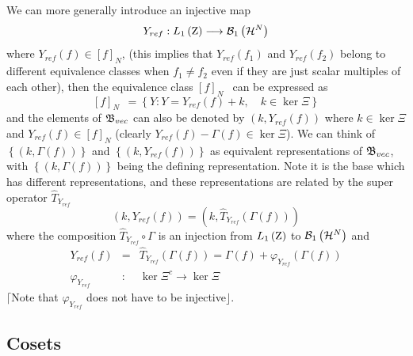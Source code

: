 We can more generally introduce an injective map 
\begin{equation}
Y_{ref}:L_{1}\left( {\rm Z}\right) \longrightarrow {\cal B}_{1}\left( {\cal H%
}^{N}\right)
\end{equation}%
where $Y_{ref}\left( f\right) \in \left[ f\right] _{N}$, (this implies that $%
Y_{ref}\left( f_{1}\right) $ and $Y_{ref}\left( f_{2}\right) $ belong to
different equivalence classes when $f_{1}\neq f_{2}$ even if they are just
scalar multiples of each other), then the equivalence class $\left[ f\right]
_{N\text{ }}$ can be expressed as 
\begin{equation}
\left[ f\right] _{N\text{ }}=\left\{ Y:Y=Y_{ref}\left( f\right) +k,\quad
k\in \ker \Xi \right\}
\end{equation}%
and the elements of ${\frak B}_{vec}$ can also be denoted by $\left(
k,Y_{ref}\left( f\right) \right) $ where $k\in \ker \Xi $ and $Y_{ref}\left(
f\right) \in \left[ f\right] _{N}$ (clearly $Y_{ref}\left( f\right) -\Gamma
\left( f\right) \in \ker \Xi $). We can think of $\left\{ \left( k,\Gamma
\left( f\right) \right) \right\} $ and $\left\{ \left( k,Y_{ref}\left(
f\right) \right) \right\} $ as equivalent representations of ${\frak B}%
_{vec} $, with $\left\{ \left( k,\Gamma \left( f\right) \right) \right\} $
being the defining representation. Note it is the base which has different
representations, and these representations are related by the super operator 
$\hat{T}_{Y_{ref}}$ 
\begin{equation}
\left( k,Y_{ref}\left( f\right) \right) =\left( k,\hat{T}_{Y_{ref}}\left(
\Gamma \left( f\right) \right) \right)
\end{equation}%
where the composition $\hat{T}_{Y_{ref}}\circ \Gamma $ is an injection from $%
L_{1}\left( {\rm Z}\right) $ to ${\cal B}_{1}\left( {\cal H}^{N}\right) $
and 
\begin{eqnarray}
Y_{ref}\left( f\right) &=&\hat{T}_{Y_{ref}}\left( \Gamma \left( f\right)
\right) =\Gamma \left( f\right) +\varphi _{Y_{ref}}\left( \Gamma \left(
f\right) \right)  \label{newbase} \\
\varphi _{Y_{ref}} &:&\ker \Xi ^{c}\longrightarrow \ker \Xi  \nonumber
\end{eqnarray}%
$\lceil $Note that $\varphi _{Y_{ref}}$ does not have to be injective$%
\rfloor $.

\subsection{Cosets}

